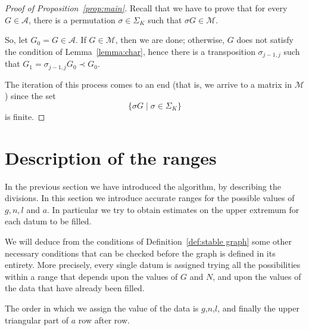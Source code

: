 \documentclass{amsart}
\theoremstyle{plain}
\theoremstyle{definition}
\newtheorem{notation}[theorem]{Notation}
\DeclareMathOperator{\MAX}{max}
\begin{document}
\begin{proof}[Proof of Proposition~\ref{prop:main}]
  Recall that we have to prove that for every $G \in \mathcal{A}$,
  there is a permutation $\sigma \in \Sigma_K$ such that $\sigma G \in
  \mathcal{M}$.

  So, let $G_0 = G \in \mathcal{A}$. If $G \in \mathcal{M}$, then we
  are done; otherwise, $G$ does not satisfy the condition of
  Lemma~\ref{lemma:char}, hence there is a transposition $\sigma_{j-1,
    j}$ such that $G_1 = \sigma_{j-1,j} G_0 \prec G_0$.

  The iteration of this process comes to an end (that is, we arrive to
  a matrix in $\mathcal{M}$) since the set
  \[
  \bigl\{ \sigma G \mid \sigma \in \Sigma_K\bigr\}
  \]
  is finite.
\end{proof}



\section{Description of the ranges}\label{sec:ranges}

In the previous section we have introduced the algorithm, by
describing the divisions. In this section we introduce accurate ranges
for the possible values of $g,n,l$ and $a$. In particular we try to
obtain estimates on the upper extremum for each datum to be filled.

We will deduce from the
conditions of Definition~\ref{def:stable graph} some other necessary
conditions that can be checked before the graph is defined in its
entirety. More precisely, every single datum is assigned trying all
the possibilities within a range that depends upon the values of $G$
and $N$, and upon the values of the data that have already been
filled.

The order in which we assign the value of the data is $g$,$n$,$l$, and
finally the upper triangular part of $a$ row after row.
\end{document}
